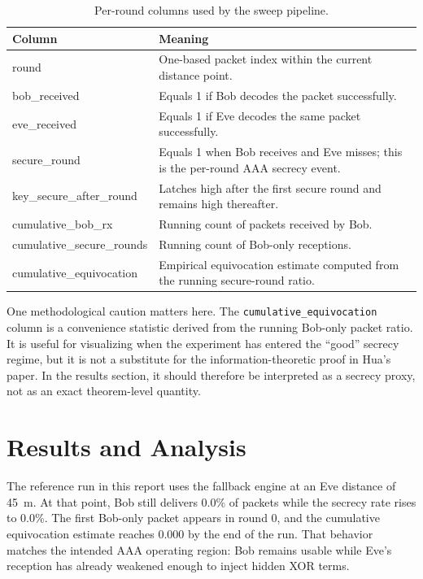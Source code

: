 \documentclass[11pt]{article}
\newcommand{\ReferenceDistanceMeters}{45}
\newcommand{\ReferenceEngineLabel}{fallback}
\newcommand{\ReferenceAvailabilityPct}{0.0}
\newcommand{\ReferenceSecrecyPct}{0.0}
\newcommand{\ReferenceEquivocation}{0.000}
\newcommand{\ReferenceFirstSecureRound}{0}
\begin{document}
\begin{table}[t]
\centering
\caption{Per-round columns used by the sweep pipeline.}
\begin{tabularx}{\linewidth}{>{\ttfamily}l Y}
\toprule
Column & Meaning \\
\midrule
round & One-based packet index within the current distance point. \\
bob\_received & Equals 1 if Bob decodes the packet successfully. \\
eve\_received & Equals 1 if Eve decodes the same packet successfully. \\
secure\_round & Equals 1 when Bob receives and Eve misses; this is the per-round AAA secrecy event. \\
key\_secure\_after\_round & Latches high after the first secure round and remains high thereafter. \\
cumulative\_bob\_rx & Running count of packets received by Bob. \\
cumulative\_secure\_rounds & Running count of Bob-only receptions. \\
cumulative\_equivocation & Empirical equivocation estimate computed from the running secure-round ratio. \\
\bottomrule
\end{tabularx}
\end{table}

One methodological caution matters here. The \texttt{cumulative\_equivocation} column is a convenience statistic derived from the running Bob-only packet ratio. It is useful for visualizing when the experiment has entered the ``good'' secrecy regime, but it is not a substitute for the information-theoretic proof in Hua's paper. In the results section, it should therefore be interpreted as a secrecy proxy, not as an exact theorem-level quantity.

\section{Results and Analysis}
The reference run in this report uses the \ReferenceEngineLabel{} engine at an Eve distance of \SI{\ReferenceDistanceMeters}{m}. At that point, Bob still delivers \ReferenceAvailabilityPct\% of packets while the secrecy rate rises to \ReferenceSecrecyPct\%. The first Bob-only packet appears in round \ReferenceFirstSecureRound{}, and the cumulative equivocation estimate reaches \ReferenceEquivocation{} by the end of the run. That behavior matches the intended AAA operating region: Bob remains usable while Eve's reception has already weakened enough to inject hidden XOR terms.
\end{document}
